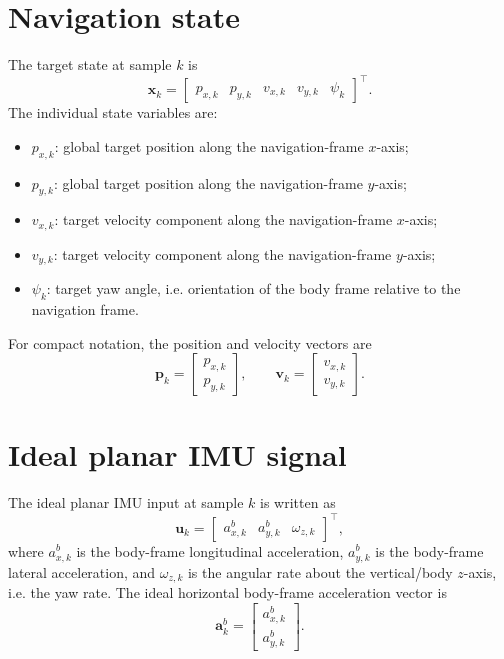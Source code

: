 \section{Navigation state}
The target state at sample $k$ is
\begin{equation}
\bm{x}_k=
\begin{bmatrix}
p_{x,k} & p_{y,k} & v_{x,k} & v_{y,k} & \psi_k
\end{bmatrix}^{\top}.
\label{eq:state}
\end{equation}
The individual state variables are:
\begin{itemize}
    \item $p_{x,k}$: global target position along the navigation-frame $x$-axis;
    \item $p_{y,k}$: global target position along the navigation-frame $y$-axis;
    \item $v_{x,k}$: target velocity component along the navigation-frame $x$-axis;
    \item $v_{y,k}$: target velocity component along the navigation-frame $y$-axis;
    \item $\psi_k$: target yaw angle, i.e. orientation of the body frame relative to the navigation frame.
\end{itemize}
For compact notation, the position and velocity vectors are
\begin{equation}
\bm{p}_k=
\begin{bmatrix}p_{x,k}\\p_{y,k}\end{bmatrix},
\qquad
\bm{v}_k=
\begin{bmatrix}v_{x,k}\\v_{y,k}\end{bmatrix}.
\end{equation}

\section{Ideal planar IMU signal}
The ideal planar IMU input at sample $k$ is written as
\begin{equation}
\bm{u}_k=
\begin{bmatrix}
a_{x,k}^{b} & a_{y,k}^{b} & \omega_{z,k}
\end{bmatrix}^{\top},
\end{equation}
where $a_{x,k}^{b}$ is the body-frame longitudinal acceleration, $a_{y,k}^{b}$ is the body-frame lateral acceleration, and $\omega_{z,k}$ is the angular rate about the vertical/body $z$-axis, i.e. the yaw rate. The ideal horizontal body-frame acceleration vector is
\begin{equation}
\bm{a}_k^b=
\begin{bmatrix}a_{x,k}^{b}\\a_{y,k}^{b}\end{bmatrix}.
\end{equation}

